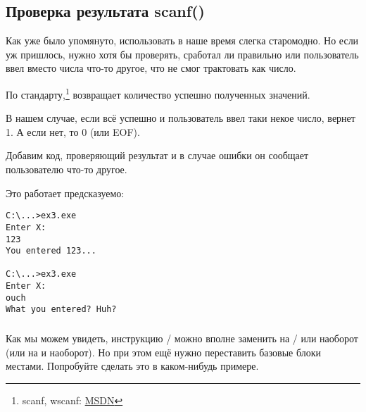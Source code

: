 \subsection{Проверка результата scanf()}

Как уже было упомянуто, использовать \scanf в наше время слегка старомодно. 
Но если уж пришлось, нужно хотя бы проверять, сработал ли \scanf 
правильно или пользователь ввел вместо числа что-то другое, что \scanf не смог трактовать как число.



По стандарту,\scanf\footnote{scanf, wscanf: \href{http://go.yurichev.com/17255}{MSDN}} возвращает количество успешно полученных значений.

В нашем случае, если всё успешно и пользователь ввел таки некое число, \scanf вернет 1. А если нет, то 0 (или \ac{EOF}).

Добавим код, проверяющий результат \scanf и в случае ошибки он сообщает пользователю что-то другое.

Это работает предсказуемо:

\begin{lstlisting}
C:\...>ex3.exe
Enter X:
123
You entered 123...

C:\...>ex3.exe
Enter X:
ouch
What you entered? Huh?
\end{lstlisting}






\subsubsection{\Exercise}

Как мы можем увидеть, инструкцию / можно вполне заменить на / или наоборот 
(или  на  и наоборот).
Но при этом ещё нужно переставить базовые блоки местами.
Попробуйте сделать это в каком-нибудь примере.
